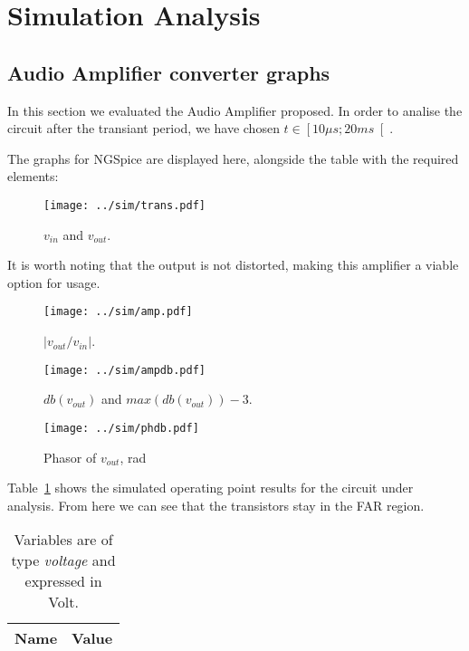\section{Simulation Analysis }
\label{sec:simulation}

\subsection{Audio Amplifier converter graphs}

In this section we evaluated the Audio Amplifier proposed.
In order to analise the circuit after the transiant period, we have chosen $t \in \left[ 10 \mu s; 20 ms \right[ $.

The graphs for NGSpice are displayed here, alongside the table with the required elements:

\begin{figure}[h] 
	\centering
	\vspace{-3cm}
	\texttt{[image: ../sim/trans.pdf]}
	\caption{$v_{in}$ and $v_{out}$.}
	\label{fig:SIM_TRANS}
\end{figure}

It is worth noting that the output is not distorted, making this amplifier a viable option for usage.

\begin{figure}[h] \centering
	\vspace{-3cm}
	\texttt{[image: ../sim/amp.pdf]}
	\caption{$ \left | v_{out}/v_{in} \right |$.}
	\label{fig:SIM_ENV}
\end{figure}

\newpage

\begin{figure}[h] \centering
	\vspace{-3cm}
	\texttt{[image: ../sim/ampdb.pdf]}
	\caption{$db(v_{out})$ and $max(db(v_{out}))-3$.}
	\label{fig:SIM_OUT}
\end{figure}

\begin{figure}[h] \centering
	\vspace{-3cm}
	\texttt{[image: ../sim/phdb.pdf]}
	\caption{Phasor of $v_{out}$, rad}
	\label{fig:SIM_OUT-12}
\end{figure}

\newpage

Table~\ref{tab:SIM_DC} shows the simulated operating point results for the circuit under analysis. From here we can see that the transistors stay in the FAR region.
\begin{table}[h]
  \centering
  \begin{tabular}{|l|r|}
    \hline    
    {\bf Name} & {\bf Value} \\ \hline
    
  \end{tabular}
  \caption{Variables are of type {\it voltage} and expressed in Volt.}
  \label{tab:SIM_DC}
\end{table}

